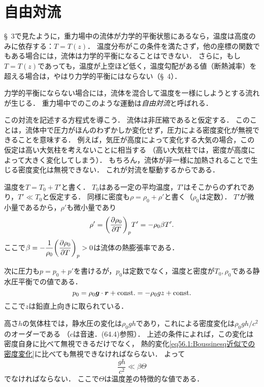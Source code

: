 \section{自由対流}

\S~3で見たように，重力場中の流体が力学的平衡状態にあるなら，温度は高度のみに依存する：$T=T(z)$．
温度分布がこの条件を満たさず，他の座標の関数でもある場合には，流体は力学的平衡になることはできない．
さらに，もし$T=T(z)$であっても，温度が上空ほど低く，温度勾配がある値（断熱減率）を超える場合は，やはり力学的平衡にはならない（\S~4）．

力学的平衡にならない場合には，流体を混合して温度を一様にしようとする流れが生じる．
重力場中でのこのような運動は\emph{自由対流}と呼ばれる．


この対流を記述する方程式を導こう．
流体は非圧縮であると仮定する．
このことは，流体中で圧力がほんのわずかしか変化せず，圧力による密度変化が無視できることを意味する．
例えば，気圧が高度によって変化する大気の場合，この仮定は高い大気柱を考えないことに相当する
（高い大気柱では，密度が高度によって大きく変化してしまう）．
もちろん，流体が非一様に加熱されることで生じる密度変化は無視できない．
これが対流を駆動するからである．


温度を$T=T_0+T'$と書く．
$T_0$はある一定の平均温度，$T'$はそこからのずれであり，$T' \ll T_0$と仮定する．
同様に密度も$\rho=\rho_0+\rho'$と書く（$\rho_0$は定数）．
$T'$が微小量であるから，$\rho'$も微小量であり
\begin{equation}\label{eq56.1:Boussinesq近似での密度変化}
    \rho' = \PDV{\rho_0}{T}{p} T' = -\rho_0 \beta T'.
\end{equation}
ここで$\beta = -\dfrac{1}{\rho_0}\dPDV{\rho_0}{T}{p}>0$は流体の熱膨張率である．


次に圧力も$p=p_0+p'$を書けるが，$p_0$は定数でなく，温度と密度が$T_0,\rho_0$である静水圧平衡での値である．
\begin{equation}
    p_0 = \rho_0 \vb*{g} \cdot \vb*{r} + \mathrm{const.}
    = -\rho_0 gz + \mathrm{const.}
\end{equation}
ここで$z$は鉛直上向きに取られている．



\spade
高さ$h$の気体柱では，静水圧の変化は$\rho_0 gh$であり，これによる密度変化は$\rho_0 gh/c^2$のオーダーである
（$c$は音速．(64.4)参照）．
上述の条件によれば，この変化は密度自身に比べて無視できるだけでなく，
熱的変化\eqref{eq56.1:Boussinesq近似での密度変化}に比べても無視できなければならない．
よって
\begin{equation}
    \frac{gh}{c^2} \ll \beta \Theta
\end{equation}
でなければならない．
ここで$\Theta$は温度差の特徴的な値である．


